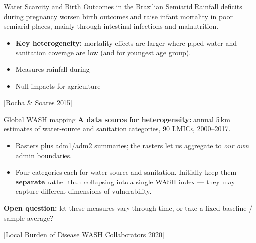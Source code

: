 \documentclass[10pt, aspectratio=169]{beamer}
\newcommand{\paperlink}[2]{\href{#1}{\textcolor{blue!50!black}{\footnotesize [#2]}}}
\begin{document}
\begin{frame}{Water Scarcity and Birth Outcomes in the Brazilian Semiarid}
  Rainfall deficits during pregnancy worsen birth outcomes and raise infant mortality in poor semiarid places, mainly through intestinal infections and malnutrition.
  \vspace{0.6em}
  \begin{itemize}
    \item \textbf{Key heterogeneity:} mortality effects are larger where piped-water and sanitation coverage are low (and for youngest age group). 
    \item Measures rainfall during 
    \item Null impacts for agriculture
  \end{itemize}

  \vfill
    \paperlink{https://doi.org/10.1016/j.jdeveco.2014.10.003}{Rocha \& Soares 2015}
\end{frame}

\begin{frame}{Global WASH mapping }
  \textbf{A data source for heterogeneity:} annual 5\,km estimates of water-source
  and sanitation categories, 90 LMICs, 2000--2017.
  \vspace{0.6em}
  \begin{itemize}
    \item Rasters plus adm1/adm2 summaries; the rasters let us aggregate to
          \emph{our own} admin boundaries.
    \item Four categories each for water source and sanitation.
          Initially keep them \textbf{separate} rather than collapsing into a
          single WASH index --- they may capture different dimensions of
          vulnerability.
  \end{itemize}
  \vspace{0.6em}
  \textbf{Open question:} let these measures vary through time, or take a fixed
  baseline / sample average?

  \vfill 
    \paperlink{https://doi.org/10.1016/S2214-109X(20)30278-3}{Local Burden of Disease WASH Collaborators 2020}
\end{frame}
\end{document}
